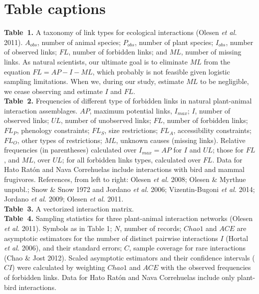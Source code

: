 \documentclass[12pt]{article}
\begin{document}
\section*{Table captions}
\noindent \textbf{Table~1.} A taxonomy of link types for ecological interactions (Olesen \emph{et al.} 2011). $A_{obs}$, number of animal species; $P_{obs}$, number of plant species; $I_{obs}$, number of observed links; $FL$, number of forbidden links; and $ML$, number of missing links. As natural scientists, our ultimate goal is to eliminate $ML$ from the equation $FL = AP - I - ML$, which probably is not feasible given logistic sampling limitations. When we, during our study, estimate $ML$ to be negligible, we cease observing and estimate $I$ and $FL$.\\

\noindent \textbf{Table~2.} Frequencies of different type of forbidden links in natural plant-animal interaction assemblages. $AP$, maximum potential links, $I_{max}$; $I$, number of observed links; $UL$, number of unobserved links; $FL$, number of forbidden links; $FL_P$, phenology constraints; $FL_S$, size restrictions; $FL_A$, accessibility constraints; $FL_O$, other types of restrictions; $ML$, unknown causes (missing links). Relative frequencies (in parentheses) calculated over $I_{max}= AP$ for $I$ and $UL$; those for $FL$, and $ML$, over $UL$; for all forbidden links types, calculated over $FL$. Data for Hato Ratón and Nava Correhuelas include interactions with bird and mammal frugivores. References, from left to right: Olesen \emph{et al.} 2008; Olesen \& Myrthue unpubl.; Snow \& Snow 1972 and Jordano \emph{et al.} 2006; Vizentin-Bugoni \emph{et al.} 2014; Jordano \emph{et al.} 2009; Olesen \emph{et al.} 2011.  \\

\noindent \textbf{Table~3.} A vectorized interaction matrix.\\

\noindent \textbf{Table~4.} Sampling statistics for three plant-animal interaction networks (Olesen \emph{et al.} 2011). Symbols as in Table 1; $N$, number of records; $Chao1$ and $ACE$ are asymptotic estimators for the number of distinct pairwise interactions $I$ (Hortal \emph{et al.} 2006), and their standard errors; $C$, sample coverage for rare interactions (Chao \& Jost 2012). Scaled asymptotic estimators and their confidence intervals ($CI$) were calculated by weighting $Chao1$ and $ACE$ with the observed frequencies of forbidden links. Data for Hato Ratón and Nava Correhuelas include only plant-bird interactions.\\
%
\end{document}
